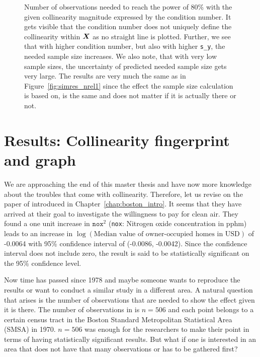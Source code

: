 \documentclass[11pt,a4paper,twoside]{book}\usepackage[]{graphicx}\usepackage[]{xcolor}
\begin{document}
\begin{figure}[H]
\begin{subfigure}[b]{1\textwidth}
\end{subfigure}
\caption{Number of observations needed to reach the power of 80\% with the given collinearity magnitude expressed by the condition number. It gets visible that the condition number does not uniquely define the collinearity within ${\boldsymbol{X}}$ as no straight line is plotted. Further, we see that with higher condition number, but also with higher \texttt{s\_y}, the needed sample size increases. We also note, that with very low sample sizes, the uncertainty of predicted needed sample size gets very large. The results are very much the same as in Figure~\ref{fig:simres_nrel1} since the effect the sample size calculation is based on, is the same and does not matter if it is actually there or not.}
\label{fig:simres_nrel2}
\end{figure}












\chapter{Results: Collinearity fingerprint and graph}\label{chap:collfinger}



We are approaching the end of this master thesis and have now more knowledge about the troubles that come with collinearity.
Therefore, let us revise on the paper of \cite{Harrison1978} introduced in Chapter~\ref{chap:boston_intro}. It seems that they have arrived at their goal to investigate the willingness to pay for clean air. They found a one unit increase in $\texttt{nox}^2$ (\texttt{nox}: Nitrogen oxide concentration in pphm) leads to an increase in $\log\left(\text{Median value of owner-occupied homes in USD}\right)$ of -0.0064 with 95\% confidence interval of (-0.0086, -0.0042).
Since the confidence interval does not include zero, the result is said to be statistically significant on the 95\% confidence level.

Now time has passed since 1978 and maybe someone wants to reproduce the results or want to conduct a similar study in a different area. A natural question that arises is the number of observations that are needed to show the effect given it is there. The number of observations in \cite{Harrison1978} is $n=506$ and each point belongs to a certain census tract in the Boston Standard Metropolitan Statistical Area (SMSA) in 1970. $n=506$ was enough for the researchers to make their point in terms of having statistically significant results. But what if one is interested in an area that does not have that many observations or has to be gathered first?
\end{document}
